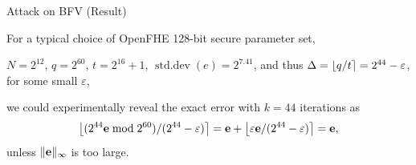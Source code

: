 \documentclass[handout]{beamer}
\begin{document}
    \begin{frame}{\krd Attack on BFV (Result)} 

    {

    For a typical choice of OpenFHE 128-bit secure parameter set, \vspace{0.3cm}
    
    $N = 2^{12}$, $q=2^{60}$, $t = 2^{16}+1$, $\operatorname{std.dev}(e) = 2^{7.41}$, and thus $\Delta = \left\lfloor q/t \right\rceil = 2^{44}-\varepsilon$, for some small $\varepsilon$, \vspace{0.3cm}
    
    we could experimentally reveal the exact error with $k=44$ iterations as
    \[
        \left\lfloor ({2^{44}\mathbf{e} \bmod 2^{60}})/(2^{44}-\varepsilon) \right\rceil = \mathbf{e} + \left\lfloor \varepsilon\mathbf{e} / (2^{44}-\varepsilon) \right\rceil = \mathbf{e},
    \]
    unless $\Vert\mathbf{e}\Vert_\infty$ is too large. 
    }
    \end{frame}

    
				
				
				
				
\end{document}

